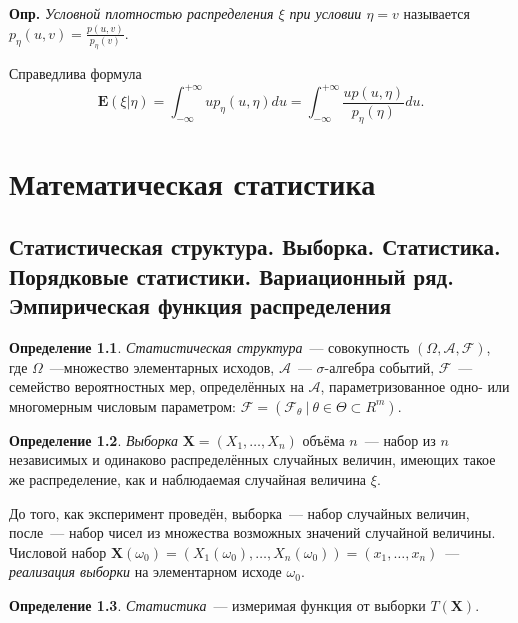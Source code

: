 \documentclass[oneside,final,14pt]{extreport}
\newcommand\mydef{{\bf Опр.}}
\theoremstyle{definition}
\newtheorem{defn}{Определение}[section]
\begin{document}
\mydef{} {\it Условной плотностью распределения $\xi$ при условии $\eta = v$} называется $p_{\eta}(u, v)=\frac{p(u, v)}{p_{\eta}(v)}$.

Справедлива формула
$$\mathbf{E}(\xi | \eta)=\int_{-\infty}^{+\infty} u p_{\eta}(u, \eta) d u=\int_{-\infty}^{+\infty} \frac{u p(u, \eta)}{p_{\eta}(\eta)} d u.$$

\chapter{Математическая статистика}

\section{Статистическая структура. Выборка. Статистика. Порядковые статистики. Вариационный ряд. Эмпирическая функция распределения}

\begin{defn}
{\it Статистическая структура}~--- совокупность $(\Omega, \mathcal{A}, \mathcal{F})$, где $\Omega$~---множество элементарных исходов, $\mathcal{A}$~--- $\sigma$-алгебра событий, $\mathcal{F}$~--- семейство вероятностных мер, определённых на $\mathcal{A}$, параметризованное одно- или многомерным числовым параметром: $\mathcal{F} = (\mathcal{F}_{\theta}~|~\theta \in \Theta \subset R^{m})$.
\end{defn}

\begin{defn}
{\it Выборка} $\mathbf{X} = (X_{1}, \ldots, X_{n})$ объёма $n$~--- набор из $n$ независимых и одинаково распределённых случайных величин, имеющих такое же распределение, как и наблюдаемая случайная величина $\xi$.
\end{defn}

До того, как эксперимент проведён, выборка~--- набор случайных величин, после~--- набор чисел из множества возможных значений случайной величины. Числовой набор $\mathbf{X}(\omega_0) = (X_{1}(\omega_0), \ldots, X_{n}(\omega_0)) = (x_1, \ldots, x_n)$~--- {\it реализация выборки} на элементарном исходе $\omega_0$.

\begin{defn}
{\it Статистика}~--- измеримая функция от выборки $T(\mathbf{X})$.
\end{defn}
\end{document}

